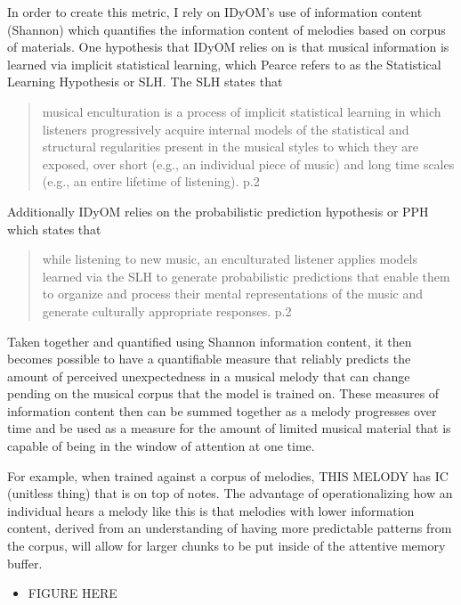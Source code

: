 \documentclass[]{book}
\providecommand{\tightlist}{%
  \setlength{\itemsep}{0pt}\setlength{\parskip}{0pt}}
\theoremstyle{definition}
\theoremstyle{definition}
\theoremstyle{definition}
\theoremstyle{remark}
\begin{document}
In order to create this metric, I rely on IDyOM's use of information
content (Shannon) which quantifies the information content of melodies
based on corpus of materials. One hypothesis that IDyOM relies on is
that musical information is learned via implicit statistical learning,
which Pearce refers to as the Statistical Learning Hypothesis or SLH.
The SLH states that

\begin{quote}
musical enculturation is a process of implicit statistical learning in
which listeners progressively acquire internal models of the statistical
and structural regularities present in the musical styles to which they
are exposed, over short (e.g., an individual piece of music) and long
time scales (e.g., an entire lifetime of listening). p.2
\end{quote}

Additionally IDyOM relies on the probabilistic prediction hypothesis or
PPH which states that

\begin{quote}
while listening to new music, an enculturated listener applies models
learned via the SLH to generate probabilistic predictions that enable
them to organize and process their mental representations of the music
and generate culturally appropriate responses. p.2
\end{quote}

Taken together and quantified using Shannon information content, it then
becomes possible to have a quantifiable measure that reliably predicts
the amount of perceived unexpectedness in a musical melody that can
change pending on the musical corpus that the model is trained on. These
measures of information content then can be summed together as a melody
progresses over time and be used as a measure for the amount of limited
musical material that is capable of being in the window of attention at
one time.

For example, when trained against a corpus of melodies, THIS MELODY has
IC (unitless thing) that is on top of notes. The advantage of
operationalizing how an individual hears a melody like this is that
melodies with lower information content, derived from an understanding
of having more predictable patterns from the corpus, will allow for
larger chunks to be put inside of the attentive memory buffer.

\begin{itemize}
\tightlist
\item
  FIGURE HERE
\end{itemize}
\end{document}
